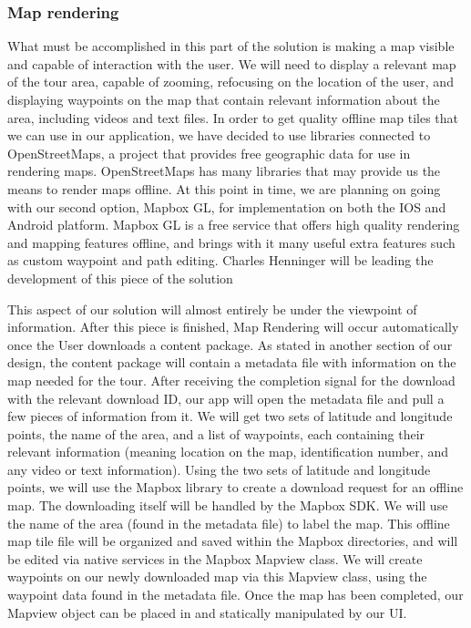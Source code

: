 \documentclass[letterpaper, 10pt,titlepage]{article}
\begin{document}
\subsubsection{Map rendering}
What must be accomplished in this part of the solution is making a map visible and capable of interaction with the user. We will need to display a relevant map of the tour area, capable of zooming, refocusing on the location of the user, and displaying waypoints on the map that contain relevant information about the area, including videos and text files. In order to get quality offline map tiles that we can use in our application, we have decided to use libraries connected to OpenStreetMaps, a project that provides free geographic data for use in rendering maps. OpenStreetMaps has many libraries that may provide us the means to render maps offline. At this point in time, we are planning on going with our second option, Mapbox GL, for implementation on both the IOS and Android platform. Mapbox GL is a free service that offers high quality rendering and mapping features offline, and brings with it many useful extra features such as custom waypoint and path editing. Charles Henninger will be leading the development of this piece of the solution


This aspect of our solution will almost entirely be under the viewpoint of information. After this piece is finished, Map Rendering will occur automatically once the User downloads a content package. As stated in another section of our design, the content package will contain a metadata file with information on the map needed for the tour. After receiving the completion signal for the download with the relevant download ID, our app will open the metadata file and pull a few pieces of information from it. We will get two sets of latitude and longitude points, the name of the area, and a list of waypoints, each containing their relevant information (meaning location on the map, identification number, and any video or text information). Using the two sets of latitude and longitude points, we will use the Mapbox library to create a download request for an offline map. The downloading itself will be handled by the Mapbox SDK. We will use the name of the area (found in the metadata file) to label the map. This offline map tile file will be organized and saved within the Mapbox directories, and will be edited via native services in the Mapbox Mapview class. We will create waypoints on our newly downloaded map via this Mapview class, using the waypoint data found in the metadata file. Once the map has been completed, our Mapview object can be placed in and statically manipulated by our UI.
\end{document}
